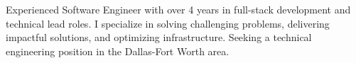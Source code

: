 

\begin{cvparagraph}

Experienced Software Engineer with over 4 years in full-stack development and technical lead roles. I specialize in solving challenging problems, delivering impactful solutions, and optimizing infrastructure. Seeking a technical engineering position in the Dallas-Fort Worth area.
\end{cvparagraph}
